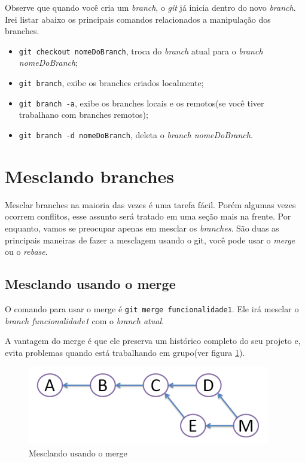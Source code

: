 \documentclass[12pt,openright,oneside,a4paper,english,brazil]{abntex2}
\begin{document}
Observe que quando você cria um \textit{branch}, o \textit{git} já inicia dentro do novo \textit{branch}. Irei listar abaixo os principais comandos relacionados a manipulação dos branches.

\begin{itemize}
	\item \verb|git checkout nomeDoBranch|, troca do \textit{branch} atual para o \textit{branch nomeDoBranch};
	\item \verb|git branch|, exibe os branches criados localmente;
	\item \verb|git branch -a|, exibe os branches locais e os remotos(se você tiver trabalhano com branches remotos);
	\item \verb|git branch -d nomeDoBranch|, deleta o \textit{branch nomeDoBranch}.
\end{itemize}

\section{Mesclando branches}

Mesclar branches na maioria das vezes é uma tarefa fácil. Porém algumas vezes ocorrem conflitos, esse assunto será tratado em uma seção mais na frente. Por enquanto, vamos se preocupar apenas em mesclar os \textit{branches}. São duas as principais maneiras de fazer a mesclagem usando o git, você pode usar o \textit{merge} ou o \textit{rebase}.

\subsection{Mesclando usando o merge}

O comando para usar o merge é  \verb|git merge funcionalidade1|. Ele irá mesclar o \textit{branch funcionalidade1} com o \textit{branch atual}.

A vantagem do merge é que ele preserva um histórico completo do seu projeto e, evita problemas quando está trabalhando em grupo(ver figura \ref{merge}).

\begin{figure}[H]
	\caption{\label{merge}Mesclando usando o merge}
	\begin{center}
		\includegraphics[width=0.5\linewidth]{merge}
	\end{center}
\end{figure}
\end{document}
